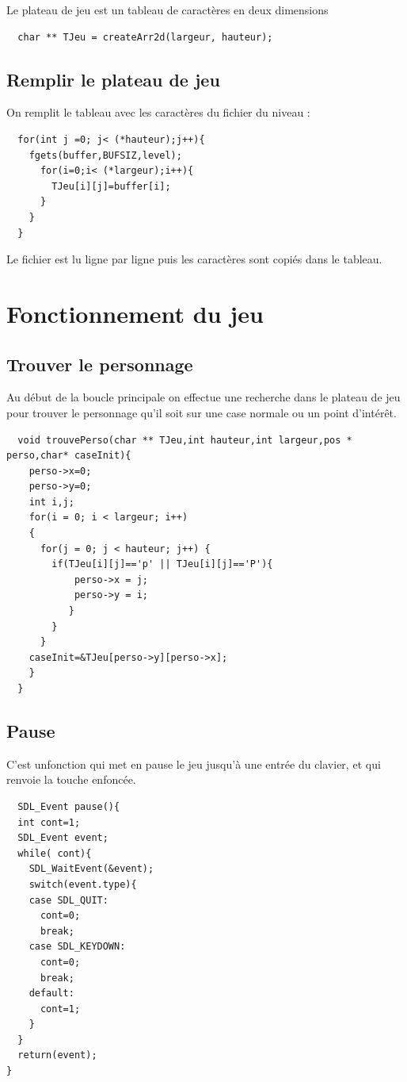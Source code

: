 \documentclass{article}
\begin{document}
Le plateau de jeu est un tableau de caractères en deux dimensions

 \begin{verbatim}
  char ** TJeu = createArr2d(largeur, hauteur);
\end{verbatim}

\subsection{Remplir le plateau de jeu}

On remplit le tableau avec les caractères du fichier du niveau :

\begin{verbatim}
  for(int j =0; j< (*hauteur);j++){
    fgets(buffer,BUFSIZ,level);
      for(i=0;i< (*largeur);i++){
        TJeu[i][j]=buffer[i];
      }
    }
  }
\end{verbatim}

Le fichier est lu ligne par ligne puis les caractères sont copiés dans le tableau.

\section{Fonctionnement du jeu}

\subsection{Trouver le personnage}
Au début de la boucle principale on effectue une recherche dans le plateau de jeu pour trouver le personnage qu'il soit sur une case normale ou un point d'intérêt.
\begin{verbatim}
  void trouvePerso(char ** TJeu,int hauteur,int largeur,pos * perso,char* caseInit){
    perso->x=0;
    perso->y=0;
    int i,j;
    for(i = 0; i < largeur; i++)
    {
      for(j = 0; j < hauteur; j++) {
        if(TJeu[i][j]=='p' || TJeu[i][j]=='P'){
  	        perso->x = j;
  	        perso->y = i;
  	       }
        }
      }
    caseInit=&TJeu[perso->y][perso->x];
    }
  }
\end{verbatim}

\subsection{Pause}

C'est unfonction qui met en pause le jeu jusqu'à une entrée du clavier, et qui renvoie la touche enfoncée.

\begin{verbatim}
  SDL_Event pause(){
  int cont=1;
  SDL_Event event;
  while( cont){
    SDL_WaitEvent(&event);
    switch(event.type){
    case SDL_QUIT:
      cont=0;
      break;
    case SDL_KEYDOWN:
      cont=0;
      break;
    default:
      cont=1;
    }
  }
  return(event);
}
\end{verbatim}
\end{document}
